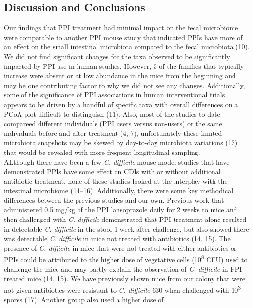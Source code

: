 \documentclass[11pt,]{article}
\begin{document}
\subsection{Discussion and
Conclusions}\label{discussion-and-conclusions}

Our findings that PPI treatment had minimal impact on the fecal
microbiome were comparable to another PPI mouse study that indicated
PPIs have more of an effect on the small intestinal microbiota compared
to the fecal microbiota (10). We did not find significant changes for
the taxa observed to be significantly impacted by PPI use in human
studies. However, 3 of the families that typically increase were absent
or at low abundance in the mice from the beginning and may be one
contributing factor to why we did not see any changes. Additionally,
some of the significance of PPI associations in human interventional
trials appears to be driven by a handful of specific taxa with overall
differences on a PCoA plot difficult to distinguish (11). Also, most of
the studies to date compareed different individuals (PPI users versus
non-users) or the same individuals before and after treatment (4, 7),
unfortunately these limited microbiota snapshots may be skewed by
day-to-day microbiota variations (13) that would be revealed with more
frequent longitudinal sampling.\\
ALthough there have been a few \emph{C. difficile} mouse model studies
that have demonstrated PPIs have some effect on CDIs with or without
additional antibiotic treatment, none of these studies looked at the
interplay with the intestinal microbiome (14--16). Additionally, there
were some key methodical differences between the previous studies and
our own. Previous work that administered 0.5 mg/kg of the PPI
lansoprazole daily for 2 weeks to mice and then challenged with \emph{C.
difficile} demonstrated that PPI treatment alone resulted in detectable
\emph{C. difficile} in the stool 1 week after challenge, but also showed
there was detectable \emph{C. difficile} in mice not treated with
antibiotics (14, 15). The presence of \emph{C. difficile} in mice that
were not treated with either antibiotics or PPIs could be attributed to
the higher dose of vegetative cells (10\textsuperscript{8} CFU) used to
challenge the mice and may partly explain the observation of \emph{C.
difficile} in PPI-treated mice (14, 15). We have previously shown mice
from our colony that were not given antibiotics were resistant to
\emph{C. difficile} 630 when challenged with 10\textsuperscript{3}
spores (17). Another group also used a higher dose of
\end{document}
